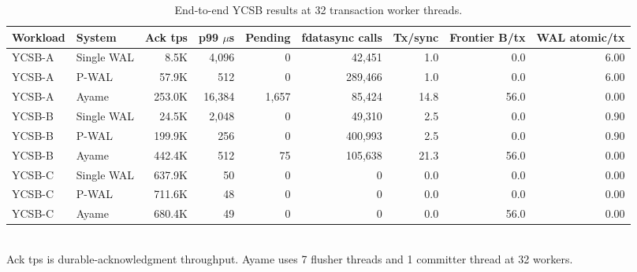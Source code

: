 \begin{table}[t]
  \centering
  \caption{End-to-end YCSB results at 32 transaction worker threads.}
  \label{tab:ycsbabc-32worker-summary}
  \small
  \setlength{\tabcolsep}{6pt}
  \begin{tabular}{llrrrrrrr}
    \hline
    Workload & System & Ack tps & p99 $\mu$s & Pending & fdatasync calls & Tx/sync & Frontier B/tx & WAL atomic/tx \\
    \hline
    YCSB-A & Single WAL & 8.5K & 4,096 & 0 & 42,451 & 1.0 & 0.0 & 6.00 \\
    YCSB-A & P-WAL & 57.9K & 512 & 0 & 289,466 & 1.0 & 0.0 & 6.00 \\
    YCSB-A & Ayame & 253.0K & 16,384 & 1,657 & 85,424 & 14.8 & 56.0 & 0.00 \\
    YCSB-B & Single WAL & 24.5K & 2,048 & 0 & 49,310 & 2.5 & 0.0 & 0.90 \\
    YCSB-B & P-WAL & 199.9K & 256 & 0 & 400,993 & 2.5 & 0.0 & 0.90 \\
    YCSB-B & Ayame & 442.4K & 512 & 75 & 105,638 & 21.3 & 56.0 & 0.00 \\
    YCSB-C & Single WAL & 637.9K & 50 & 0 & 0 & 0.0 & 0.0 & 0.00 \\
    YCSB-C & P-WAL & 711.6K & 48 & 0 & 0 & 0.0 & 0.0 & 0.00 \\
    YCSB-C & Ayame & 680.4K & 49 & 0 & 0 & 0.0 & 56.0 & 0.00 \\
    \hline
  \end{tabular}
  \\[-1mm]
  {\footnotesize Ack tps is durable-acknowledgment throughput. Ayame uses 7 flusher threads and 1 committer thread at 32 workers.}
\end{table}
